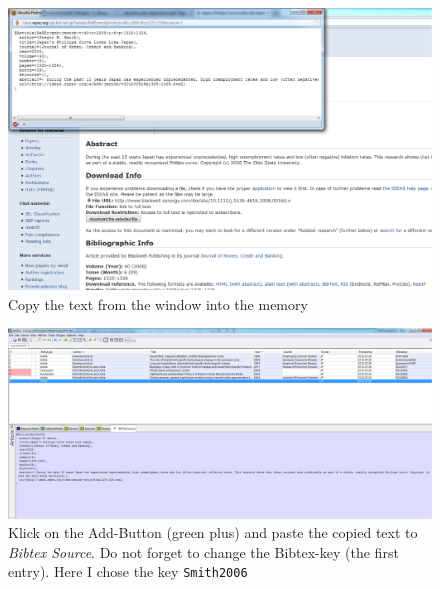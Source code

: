 \documentclass[a4paper,12pt]{scrartcl} %
\makeatletter
\def\ScaleIfNeeded{%
\ifdim\Gin@nat@width>\linewidth
\linewidth
\else
\Gin@nat@width
\fi
}
\makeatother
\begin{document}
\begin{figure}[htbp!]
\includegraphics[width=\ScaleIfNeeded]{Ideasbibtex}
\caption[Extracting References from Bibtex]{Copy the text from the window into the memory}\label{fig:Ideas2}
\end{figure}
%
\begin{figure}[htbp!]
\includegraphics[width=\ScaleIfNeeded]{JabrefAdd}
\caption[Using JabRef]{Klick on the Add-Button (green plus) and paste the copied text to \emph{Bibtex Source}. Do not forget to change the Bibtex-key (the first entry). Here I chose the key \texttt{Smith2006}}\label{fig:jabref}
\end{figure}
\end{document}

